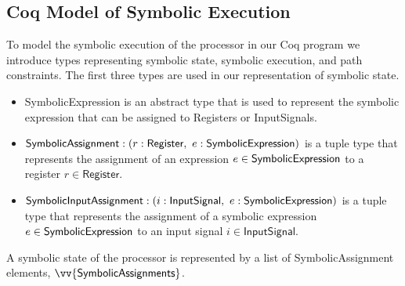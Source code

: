 





\subsection{Coq Model of Symbolic Execution}
To model the symbolic execution of the processor in our Coq program we introduce
types representing symbolic state, symbolic
execution, and path constraints. The first three types are used in our
representation of symbolic state. 
\begin{itemize}
  \item \textsf{SymbolicExpression} is an abstract type that is used to
    represent the symbolic expression that can be assigned to \textsf{Register}s
    or \textsf{InputSignal}s.
  \item $\textsf{SymbolicAssignment} : (r: \textsf{Register},~
    e: \textsf{SymbolicExpression})$ is a tuple type that
    represents the assignment of an expression $e \in
    \textsf{SymbolicExpression}$ to a register $r \in \textsf{Register}$.
  \item $\textsf{SymbolicInputAssignment} : (i: \textsf{InputSignal},~
    e: \textsf{SymbolicExpression})$ is a tuple type that
    represents the assignment of a symbolic expression $e \in
    \textsf{SymbolicExpression}$ to an input signal $i \in \textsf{InputSignal}$.
\end{itemize}

A symbolic state of the processor is represented by a list of
\textsf{SymbolicAssignment} elements, $\vv{\textsf{SymbolicAssignments}}$. 



